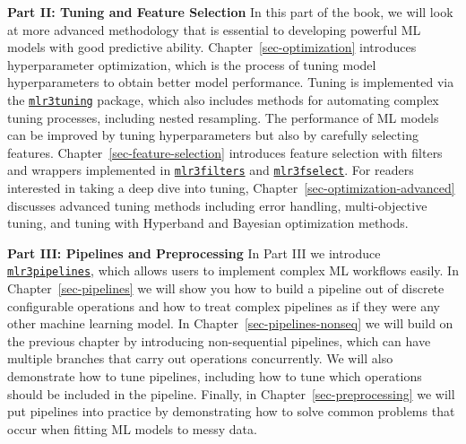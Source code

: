 \textbf{Part II: Tuning and Feature Selection} In this part of the book,
we will look at more advanced methodology that is essential to
developing powerful ML models with good predictive ability.
Chapter~\ref{sec-optimization} introduces hyperparameter optimization,
which is the process of tuning model hyperparameters to obtain better
model performance. Tuning is implemented via the
\href{https://mlr3tuning.mlr-org.com}{\texttt{mlr3tuning}}
package, which also includes methods for automating complex tuning
processes, including nested resampling. The performance of ML models can
be improved by tuning hyperparameters but also by carefully selecting
features. Chapter~\ref{sec-feature-selection} introduces feature
selection with filters and wrappers implemented in
\href{https://mlr3filters.mlr-org.com}{\texttt{mlr3filters}}
and
\href{https://mlr3fselect.mlr-org.com}{\texttt{mlr3fselect}}.
For readers interested in taking a deep dive into tuning,
Chapter~\ref{sec-optimization-advanced} discusses advanced tuning
methods including error handling, multi-objective tuning, and tuning
with Hyperband and Bayesian optimization methods.

\textbf{Part III: Pipelines and Preprocessing} In Part III we introduce
\href{https://mlr3pipelines.mlr-org.com}{\texttt{mlr3pipelines}},
which allows users to implement complex ML workflows easily. In
Chapter~\ref{sec-pipelines} we will show you how to build a pipeline out
of discrete configurable operations and how to treat complex pipelines
as if they were any other machine learning model. In
Chapter~\ref{sec-pipelines-nonseq} we will build on the previous chapter
by introducing non-sequential pipelines, which can have multiple
branches that carry out operations concurrently. We will also
demonstrate how to tune pipelines, including how to tune which
operations should be included in the pipeline. Finally, in
Chapter~\ref{sec-preprocessing} we will put pipelines into practice by
demonstrating how to solve common problems that occur when fitting ML
models to messy data.

